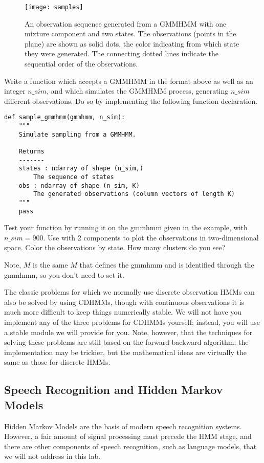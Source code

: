 \begin{figure}
\centering
\texttt{[image: samples]}
\caption{An observation sequence generated from a GMMHMM with one mixture component and two states.
The observations (points in the plane) are shown as solid dots, the color indicating from which
state they were generated. The connecting dotted lines indicate the sequential order of the observations.}
\label{fig:samples}
\end{figure}

\begin{problem}
Write a function which accepts a GMMHMM in the format above as well as an integer $n\_sim$, and which simulates the GMMHMM process, generating $n\_sim$ different observations.
Do so by implementing the following function declaration.
\begin{lstlisting}
def sample_gmmhmm(gmmhmm, n_sim):
    """
    Simulate sampling from a GMMHMM.

    Returns
    -------
    states : ndarray of shape (n_sim,)
        The sequence of states
    obs : ndarray of shape (n_sim, K)
        The generated observations (column vectors of length K)
    """
    pass
\end{lstlisting}

Test your function by running it on the gmmhmm given in the example, with $n\_sim=900$.
Use  with 2 components to plot the observations in two-dimensional space. 
Color the observations by state. How many clusters do you see?

Note, $M$ is the same $M$ that defines the gmmhmm and is identified through the gmmhmm, so you don't need to set it.

\end{problem}

The classic problems for which we normally use discrete observation HMMs can also be solved by using CDHMMs, though with continuous observations it is much more difficult to keep things numerically stable.
We will not have you implement any of the three problems for CDHMMs yourself; instead, you will use a stable module we will provide for you.
Note, however, that the techniques for solving these problems are still based on the forward-backward algorithm; the implementation may be trickier, but the mathematical
ideas are virtually the same as those for discrete HMMs.

\subsection*{Speech Recognition and Hidden Markov Models}
Hidden Markov Models are the basis of modern speech recognition systems. However, a fair amount of signal processing must precede the HMM stage, and there are other
components of speech recognition, such as language models, that we will not address in this lab.

